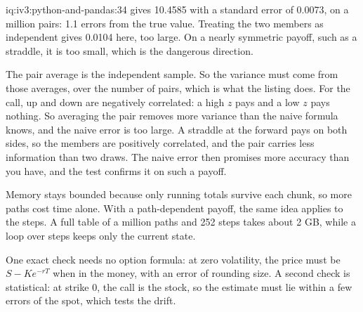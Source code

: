 \begin{solution}{iq:iv3:python-and-pandas:34}
 gives 10.4585 with a standard error of 0.0073, on a million pairs: 1.1 errors from the true value. Treating the two members as independent gives 0.0104 here, too large. On a nearly symmetric payoff, such as a straddle, it is too small, which is the dangerous direction.
\label{lst:iv3:pp:mc}

The pair average is the independent sample. So the variance must come from those averages, over the number of pairs, which is what the listing does. For the call, up and down are negatively correlated: a high $z$ pays and a low $z$ pays nothing. So averaging the pair removes more variance than the naive formula knows, and the naive error is too large. A straddle at the forward pays on both sides, so the members are positively correlated, and the pair carries less information than two draws. The naive error then promises more accuracy than you have, and the test confirms it on such a payoff.

Memory stays bounded because only running totals survive each chunk, so more paths cost time alone. With a path-dependent payoff, the same idea applies to the steps. A full table of a million paths and 252 steps takes about 2 GB, while a loop over steps keeps only the current state.

One exact check needs no option formula: at zero volatility, the price must be $S - K e^{-rT}$ when in the money, with an error of rounding size. A second check is statistical: at strike 0, the call is the stock, so the estimate must lie within a few errors of the spot, which tests the drift.

\end{solution}

